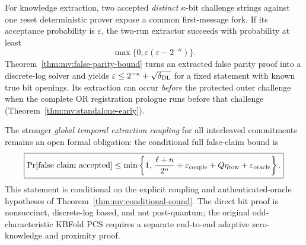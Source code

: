 For knowledge extraction, two accepted
\emph{distinct} $\kappa$-bit challenge
strings against one reset deterministic
prover expose a common first-message
fork. If its acceptance probability is
$\varepsilon$, the two-run extractor
succeeds with probability at least
\[
 \boxed{
 \max\{0,\varepsilon(\varepsilon-2^{-\kappa})\}.
 }
\]
Theorem~\ref{thm:mv:false-parity-bound}
turns an extracted false parity proof
into a discrete-log solver and yields
$\varepsilon\le2^{-\kappa}+
\sqrt{\delta_{\rm DL}}$ for a fixed
statement with known true bit openings.
Its extraction can occur \emph{before}
the protected outer challenge when
the complete OR registration prologue
runs before that challenge
(Theorem~\ref{thm:mv:standalone-early}).

The stronger \emph{global temporal extraction
coupling} for all interleaved commitments
remains an open formal obligation:
the conditional full false-claim bound is
\[
 \boxed{
 \Pr[\mathrm{false\ claim\ accepted}]
 \leq\min\left\{1,\,
 \frac{\ell+n}{2^n}+
 \varepsilon_{\rm couple}+
 Q\eta_{\rm row}+
 \varepsilon_{\rm oracle}\right\}.
 }
\]
This statement is conditional on the
explicit coupling and authenticated-oracle
hypotheses of
Theorem~\ref{thm:mv:conditional-sound}.
The direct bit proof is nonsuccinct,
discrete-log based, and not
post-quantum; the original
odd-characteristic KBFold PCS requires
a separate end-to-end adaptive
zero-knowledge and proximity proof.
